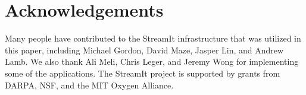 \section{Acknowledgements}

Many people have contributed to the StreamIt infrastructure that was
utilized in this paper, including Michael Gordon, David Maze, Jasper
Lin, and Andrew Lamb.  We also thank Ali Meli, Chris Leger, and Jeremy
Wong for implementing some of the applications.  The StreamIt project
is supported by grants from DARPA, NSF, and the MIT Oxygen Alliance.
